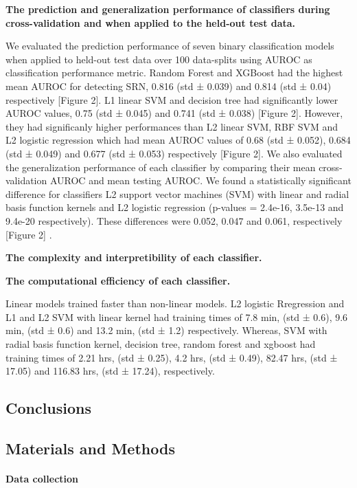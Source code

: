 \documentclass[11pt,]{article}
\let\oldparagraph\paragraph
\renewcommand{\paragraph}[1]{\oldparagraph{#1}\mbox{}}
\begin{document}
\textbf{The prediction and generalization performance of classifiers
during cross-validation and when applied to the held-out test data.}

We evaluated the prediction performance of seven binary classification
models when applied to held-out test data over 100 data-splits using
AUROC as classification performance metric. Random Forest and XGBoost
had the highest mean AUROC for detecting SRN, 0.816 (std ± 0.039) and
0.814 (std ± 0.04) respectively {[}Figure 2{]}. L1 linear SVM and
decision tree had significantly lower AUROC values, 0.75 (std ± 0.045)
and 0.741 (std ± 0.038) {[}Figure 2{]}. However, they had significanly
higher performances than L2 linear SVM, RBF SVM and L2 logistic
regression which had mean AUROC values of 0.68 (std ± 0.052), 0.684 (std
± 0.049) and 0.677 (std ± 0.053) respectively {[}Figure 2{]}. We also
evaluated the generalization performance of each classifier by comparing
their mean cross-validation AUROC and mean testing AUROC. We found a
statistically significant difference for classifiers L2 support vector
machines (SVM) with linear and radial basis function kernels and L2
logistic regression (p-values = 2.4e-16, 3.5e-13 and 9.4e-20
respectively). These differences were 0.052, 0.047 and 0.061,
respectively {[}Figure 2{]} .

\textbf{The complexity and interpretibility of each classifier.}

\textbf{The computational efficiency of each classifier.}

Linear models trained faster than non-linear models. L2 logistic
Rregression and L1 and L2 SVM with linear kernel had training times of
7.8 min, (std ± 0.6), 9.6 min, (std ± 0.6) and 13.2 min, (std ± 1.2)
respectively. Whereas, SVM with radial basis function kernel, decision
tree, random forest and xgboost had training times of 2.21 hrs, (std ±
0.25), 4.2 hrs, (std ± 0.49), 82.47 hrs, (std ± 17.05) and 116.83 hrs,
(std ± 17.24), respectively.

\subsection{Conclusions}\label{conclusions}

\subsection{Materials and Methods}\label{materials-and-methods}

\paragraph{Data collection}\label{data-collection}
\end{document}
